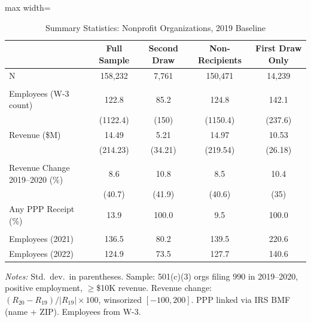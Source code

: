 \begin{table}[H]
\centering
\caption{Summary Statistics: Nonprofit Organizations, 2019 Baseline}
\label{tab:summary}
\begin{threeparttable}
\begin{adjustbox}{max width=\textwidth}
\footnotesize
\begin{tabular}{l*{4}{c}}
\toprule
 & Full Sample & Second Draw & Non-Recipients & First Draw Only \\
\midrule
N & 158,232 & 7,761 & 150,471 & 14,239 \\
\addlinespace
\multicolumn{5}{l}{\textit{Panel A: Baseline Characteristics (2019)}} \\
\addlinespace
Employees (W-3 count) & 122.8 & 85.2 & 124.8 & 142.1 \\
 & (1122.4) & (150) & (1150.4) & (237.6) \\
Revenue (\$M) & 14.49 & 5.21 & 14.97 & 10.53 \\
 & (214.23) & (34.21) & (219.54) & (26.18) \\
\addlinespace
\multicolumn{5}{l}{\textit{Panel B: COVID-19 Revenue Shock}} \\
\addlinespace
Revenue Change 2019--2020 (\%) & 8.6 & 10.8 & 8.5 & 10.4 \\
 & (40.7) & (41.9) & (40.6) & (35) \\
Any PPP Receipt (\%) & 13.9 & 100.0 & 9.5 & 100.0 \\
\addlinespace
\multicolumn{5}{l}{\textit{Panel C: Post-Treatment Employment}} \\
\addlinespace
Employees (2021) & 136.5 & 80.2 & 139.5 & 220.6 \\
Employees (2022) & 124.9 & 73.5 & 127.7 & 140.6 \\
\bottomrule
\end{tabular}
\end{adjustbox}
\begin{tablenotes}[flushleft]
\scriptsize
\item \textit{Notes:} Std.\ dev.\ in parentheses. Sample: 501(c)(3) orgs filing 990 in 2019--2020, positive employment, $\geq$\$10K revenue. Revenue change: $(R_{20}-R_{19})/|R_{19}|\times 100$, winsorized $[-100,200]$. PPP linked via IRS BMF (name + ZIP). Employees from W-3.
\end{tablenotes}
\end{threeparttable}
\end{table}
